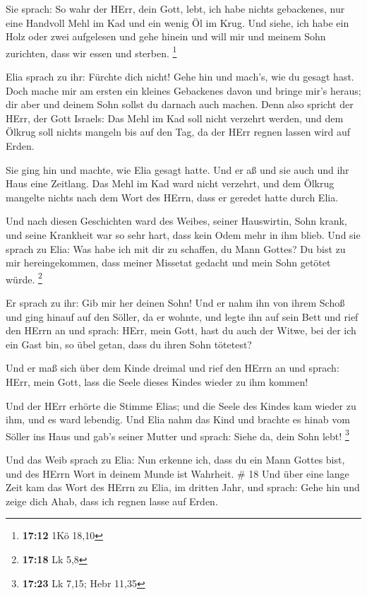  Sie sprach: So wahr der HErr, dein Gott, lebt, ich habe
nichts gebackenes, nur eine Handvoll Mehl im Kad und ein wenig Öl im
Krug. Und siehe, ich habe ein Holz oder zwei aufgelesen und gehe hinein
und will mir und meinem Sohn zurichten, dass wir essen und sterben.
\footnote{\textbf{17:12} 1Kö 18,10}

 Elia sprach zu ihr: Fürchte dich nicht! Gehe hin und
mach's, wie du gesagt hast. Doch mache mir am ersten ein kleines
Gebackenes davon und bringe mir's heraus; dir aber und deinem Sohn
sollst du darnach auch machen.  Denn also spricht der HErr,
der Gott Israels: Das Mehl im Kad soll nicht verzehrt werden, und dem
Ölkrug soll nichts mangeln bis auf den Tag, da der HErr regnen lassen
wird auf Erden.

 Sie ging hin und machte, wie Elia gesagt hatte. Und er aß
und sie auch und ihr Haus eine Zeitlang.  Das Mehl im Kad
ward nicht verzehrt, und dem Ölkrug mangelte nichts nach dem Wort des
HErrn, dass er geredet hatte durch Elia.

 Und nach diesen Geschichten ward des Weibes, seiner
Hauswirtin, Sohn krank, und seine Krankheit war so sehr hart, dass kein
Odem mehr in ihm blieb.  Und sie sprach zu Elia: Was habe
ich mit dir zu schaffen, du Mann Gottes? Du bist zu mir hereingekommen,
dass meiner Missetat gedacht und mein Sohn getötet würde. \footnote{\textbf{17:18}
  Lk 5,8}

 Er sprach zu ihr: Gib mir her deinen Sohn! Und er nahm ihn
von ihrem Schoß und ging hinauf auf den Söller, da er wohnte, und legte
ihn auf sein Bett  und rief den HErrn an und sprach: HErr,
mein Gott, hast du auch der Witwe, bei der ich ein Gast bin, so übel
getan, dass du ihren Sohn tötetest?

 Und er maß sich über dem Kinde dreimal und rief den HErrn
an und sprach: HErr, mein Gott, lass die Seele dieses Kindes wieder zu
ihm kommen!

 Und der HErr erhörte die Stimme Elias; und die Seele des
Kindes kam wieder zu ihm, und es ward lebendig.  Und Elia
nahm das Kind und brachte es hinab vom Söller ins Haus und gab's seiner
Mutter und sprach: Siehe da, dein Sohn lebt! \footnote{\textbf{17:23} Lk
  7,15; Hebr 11,35}

 Und das Weib sprach zu Elia: Nun erkenne ich, dass du ein
Mann Gottes bist, und des HErrn Wort in deinem Munde ist Wahrheit. \# 18
 Und über eine lange Zeit kam das Wort des HErrn zu Elia, im
dritten Jahr, und sprach: Gehe hin und zeige dich Ahab, dass ich regnen
lasse auf Erden.

